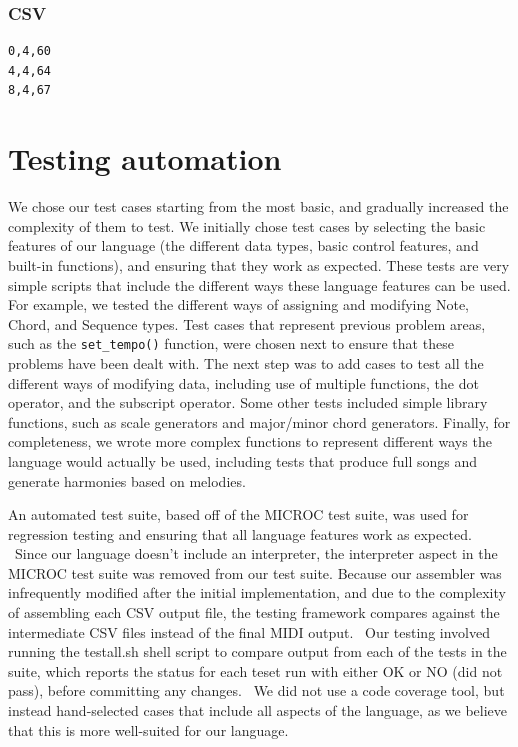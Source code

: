 \documentclass[12pt,A4]{book}
\begin{document}
\subsubsection{CSV}
\begin{verbatim}
0,4,60
4,4,64
8,4,67
\end{verbatim}

\section{Testing automation}
We chose our test cases starting from the most basic, and gradually increased the complexity of them to test.  We initially chose test cases by selecting the basic features of our language (the different data types, basic control features, and built-in functions), and ensuring that they work as expected.  These tests are very simple scripts that include the different ways these language features can be used. For example, we tested the different ways of assigning and modifying Note, Chord, and Sequence types. Test cases that represent previous problem areas, such as the \verb|set_tempo()| function, were chosen next to ensure that these problems have been dealt with.  The next step was to add cases to test all the different ways of modifying data, including use of multiple functions, the dot operator, and the subscript operator.  Some other tests included simple library functions, such as scale generators and major/minor chord generators.  Finally, for completeness, we wrote more complex functions to represent different ways the language would actually be used, including tests that produce full songs and generate harmonies based on melodies.

An automated test suite, based off of the MICROC test suite, was used for regression testing and ensuring that all language features work as expected.  Since our language doesn’t include an interpreter, the interpreter aspect in the MICROC test suite was removed from our test suite. Because our assembler was infrequently modified after the initial implementation, and due to the complexity of assembling each CSV output file, the testing framework compares against the intermediate CSV files instead of the final MIDI output.  Our testing involved running the testall.sh shell script to compare output from each of the tests in the suite, which reports the status for each teset run with either OK or NO (did not pass), before committing any changes.  We did not use a code coverage tool, but instead hand-selected cases that include all aspects of the language, as we believe that this is more well-suited for our language.
\end{document}
